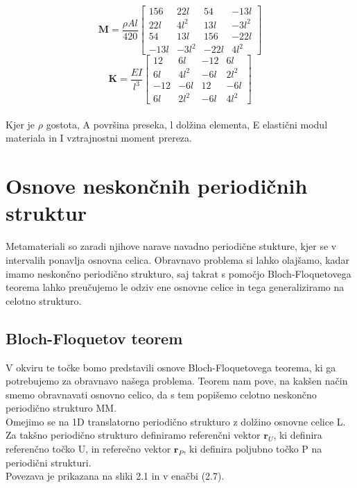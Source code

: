 \documentclass[12pt]{report}
\begin{document}
\begin{equation}
  \mathbf{M} = \frac{\rho A l}{420} 
  \begin{bmatrix}
    156 & 22l & 54 & -13l \\
    22l & 4l^2 & 13l & -3l^2 \\
    54 & 13l & 156 & -22l \\
    -13l & -3l^2 & -22l & 4l^2
  \end{bmatrix}
\end{equation}
\begin{equation}
  \mathbf{K} = \frac{EI}{l^3} 
  \begin{bmatrix}
    12 & 6l & -12 & 6l \\
    6l & 4l^2 & -6l & 2l^2 \\
    -12 & -6l & 12 & -6l \\
    6l & 2l^2 & -6l & 4l^2
  \end{bmatrix}
\end{equation}
\\
Kjer je $\rho$ gostota, A površina preseka, l dolžina elementa, E elastični modul materiala in I vztrajnostni moment prereza.

\section{Osnove neskončnih periodičnih struktur}
Metamateriali so zaradi njihove narave navadno periodične stukture, kjer se v intervalih ponavlja osnovna celica.
Obravnavo problema si lahko olajšamo, kadar imamo neskončno periodično strukturo, saj takrat s pomočjo Bloch-Floquetovega teorema lahko 
preučujemo le odziv ene osnovne celice in tega generaliziramo na celotno strukturo.

\subsection{Bloch-Floquetov teorem}
V okviru te točke bomo predstavili osnove Bloch-Floquetovega teorema, ki ga potrebujemo za obravnavo našega problema.
Teorem nam pove, na kakšen način smemo obravnavati osnovno celico, da s tem popišemo celotno neskončno periodično strukturo \ac{MM}. \\
Omejimo se na 1D translatorno periodično strukturo z dolžino osnovne celice L. Za takšno periodično strukturo definiramo referenčni vektor $\mathbf{r}_U$, 
ki definira referenčno točko U, in referečno vektor $\mathbf{r}_P$, ki definira poljubno točko P na periodični strukturi. \cite{vanbelle, kosir}
\\Povezava je prikazana na sliki 2.1 in v enačbi (2.7).
\end{document}
